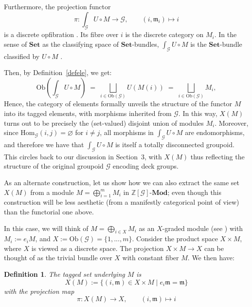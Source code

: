 \documentclass[a4paper,12pt]{article}
\newtheorem{definition}{Definition}[section]
\newcommand{\Z}{\mathbb{Z}}
\newcommand{\calG}{\mathcal{G}}
\newcommand{\Ob}{\mathrm{Ob}}
\newcommand{\Hom}{\mathrm{Hom}}
\newcommand{\Set}{\mathbf{Set}}
\newcommand{\Gint}[1]{\int_{#1}}
\newcommand{\m}{\mathfrak{m}}
\begin{document}
Furthermore, the projection functor  
\[  \pi \colon \Gint{\calG}{U \circ M}  \to \calG,   \qquad     (i, \m_i) \mapsto i  \] 
  is a discrete opfibration  \cite{riehl2016category, nlab:category_of_elements}.   Its fibre over $i$ is the discrete category on $M_i$.   In the sense of  $\Set$ as the classifying space of $\Set$-bundles, $\Gint{\calG}{U \circ M}$ is the $\Set$-bundle classified by  $U \circ M$  \cite{riehl2016category, nlab:category_of_elements}.

Then, by Definition~\ref{defele}, we get:    
\[
  \Ob\!\left(\Gint{\calG} U \circ M\right)
  \;=\; \bigsqcup_{i \in \Ob(\calG)} U(M(i))
  \;=\; \bigsqcup_{i \in \Ob(\calG)} M_i,
\]
Hence, the category of elements formally unveils the structure of the functor  $M$ into its tagged elements, with morphisms inherited from
$\calG$. In this way, $X(M)$ turns out to be precisely the (set-valued) disjoint union of modules $M_i$.  Moreover, since $\Hom_\calG(i,j) = \varnothing$ for $i \neq j$, all morphisms in $\Gint{\calG}{U \circ M}$  are endomorphisms, and therefore we have that $\Gint{\calG}{U \circ M}$  is itself a totally disconnected groupoid.  This circles back to our discussion in Section~3, with $X(M)$ thus reflecting the structure of the original groupoid $\calG$ encoding deck groups.   

      
        
As an alternate construction, let us show how we can also extract the same set $X(M)$  from a module $M = \bigoplus_{i=1}^{m} M_i$  in $\Z[\calG]\textbf{-Mod}$;  even though this construction will be less aesthetic (from a manifestly categorical point of view) than the functorial one above.      

In this case, we will think of $M = \bigoplus_{i \in X} M_i$ as an $X$-graded module (see \cite{nastasescu2004methods}) with $M_i := e_i M$, and $X := \Ob(\calG) = \{ 1, ... ,m \}$.  Consider the product space $X \times M$, where $X$ is viewed as a discrete space. The projection $X \times M \to X$ can be thought of as the trivial bundle over $X$ with constant fiber $M$. We then have:
\begin{definition}  
The \emph{tagged set} underlying $M$ is 
\[
  X(M) := \{(i, \m) \in X \times M \mid e_i \m = \m\}    \]
with the projection map  
\[   \pi : X(M) \to X, \qquad (i, \m) \mapsto i
\]
\end{definition}
\end{document}
